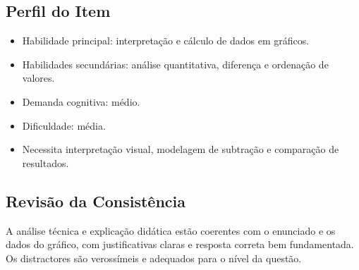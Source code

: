 \documentclass{article}
\begin{document}
\subsection*{Perfil do Item}
\begin{itemize}
  \item Habilidade principal: interpretação e cálculo de dados em gráficos.
  \item Habilidades secundárias: análise quantitativa, diferença e ordenação de valores.
  \item Demanda cognitiva: médio.
  \item Dificuldade: média.
  \item Necessita interpretação visual, modelagem de subtração e comparação de resultados.
\end{itemize}

\subsection*{Revisão da Consistência}
A análise técnica e explicação didática estão coerentes com o enunciado e os dados do gráfico, com justificativas claras e resposta correta bem fundamentada. Os distractores são verossímeis e adequados para o nível da questão.
\end{document}
